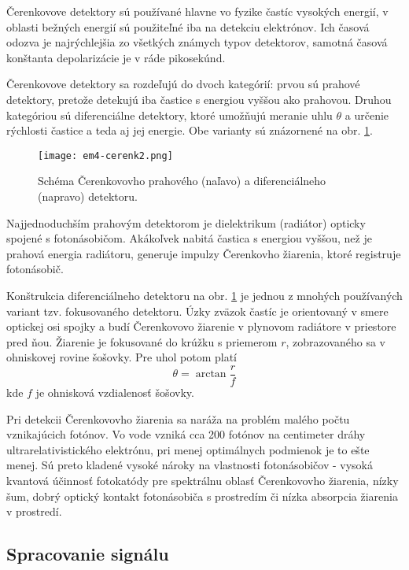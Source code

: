 \documentclass[../../main.tex]{subfiles}
\begin{document}
Čerenkovove detektory sú používané hlavne vo fyzike častíc vysokých energií, v oblasti bežných energií sú použiteľné iba na detekciu elektrónov. Ich časová odozva je najrýchlejšia zo všetkých známych typov detektorov, samotná časová konštanta depolarizácie je v ráde pikosekúnd.

Čerenkovove detektory sa rozdeľujú do dvoch kategórií: prvou sú prahové detektory, pretože detekujú iba častice s energiou vyššou ako prahovou. Druhou kategóriou sú diferenciálne detektory, ktoré umožňujú meranie uhlu $\theta$ a určenie rýchlosti častice a teda aj jej energie. Obe varianty sú znázornené na obr. \ref{em4:img:cerenk2}.

\begin{figure}[h]
\centering
\texttt{[image: em4-cerenk2.png]}
\caption{Schéma Čerenkovovho prahového (naľavo) a diferenciálneho (napravo) detektoru.}
\label{em4:img:cerenk2}
\end{figure}

Najjednoduchším prahovým detektorom je dielektrikum (radiátor) opticky spojené s fotonásobičom. Akákoľvek nabitá častica s energiou vyššou, než je prahová energia radiátoru, generuje impulzy Čerenkovho žiarenia, ktoré registruje fotonásobič.

Konštrukcia diferenciálneho detektoru na obr. \ref{em4:img:cerenk2} je jednou z mnohých používaných variant tzv. fokusovaného detektoru. Úzky zväzok častíc je orientovaný v smere optickej osi spojky a budí Čerenkovovo žiarenie v plynovom radiátore v priestore pred ňou. Žiarenie je fokusované do krúžku s priemerom $r$, zobrazovaného sa v ohniskovej rovine šošovky. Pre uhol potom platí
\begin{equation}
\theta=\arctan\dfrac{r}{f}
\end{equation}
kde $f$ je ohnisková vzdialenosť šošovky.

Pri detekcii Čerenkovovho žiarenia sa naráža na problém malého počtu vznikajúcich fotónov. Vo vode vzniká cca 200 fotónov na centimeter dráhy ultrarelativistického elektrónu, pri menej optimálnych podmienok je to ešte menej. Sú preto kladené vysoké nároky na vlastnosti fotonásobičov - vysoká kvantová účinnosť fotokatódy pre spektrálnu oblasť Čerenkovovho žiarenia, nízky šum, dobrý optický kontakt fotonásobiča s prostredím či nízka absorpcia žiarenia v prostredí. 

\subsection{Spracovanie signálu}
\end{document}
